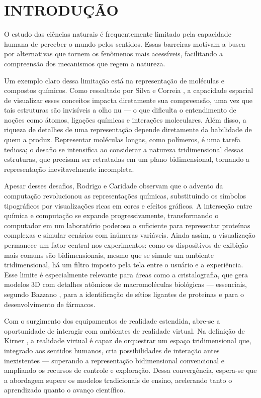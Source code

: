 \chapter{\MakeUppercase{Introdução}}\label{chap:introducao}

O estudo das ciências naturais é frequentemente limitado pela capacidade humana de perceber o mundo pelos sentidos. Essas barreiras motivam a busca por alternativas que tornem os fenômenos mais acessíveis, facilitando a compreensão dos mecanismos que regem a natureza.

Um exemplo claro dessa limitação está na representação de moléculas e compostos químicos. Como ressaltado por Silva e Correia \cite{silva_ensino_2024}, a capacidade espacial de visualizar esses conceitos impacta diretamente sua compreensão, uma vez que tais estruturas são invisíveis a olho nu — o que dificulta o entendimento de noções como átomos, ligações químicas e interações moleculares. Além disso, a riqueza de detalhes de uma representação depende diretamente da habilidade de quem a produz. Representar moléculas longas, como polímeros, é uma tarefa tediosa; o desafio se intensifica ao considerar a natureza tridimensional dessas estruturas, que precisam ser retratadas em um plano bidimensional, tornando a representação inevitavelmente incompleta.

Apesar desses desafios, Rodrigo e Caridade \cite{rodrigues_historia_2024} observam que o advento da computação revolucionou as representações químicas, substituindo os símbolos tipográficos por visualizações ricas em cores e efeitos gráficos. A interseção entre química e computação se expande progressivamente, transformando o computador em um laboratório poderoso o suficiente para representar proteínas complexas e simular cenários com inúmeras variáveis. Ainda assim, a visualização permanece um fator central nos experimentos: como os dispositivos de exibição mais comuns são bidimensionais, mesmo que se simule um ambiente tridimensional, há um filtro imposto pela tela entre o usuário e a experiência. Esse limite é especialmente relevante para áreas como a cristalografia, que gera modelos 3D com detalhes atômicos de macromoléculas biológicas — essenciais, segundo Bazzano \cite{bazzano_modelagens_2022}, para a identificação de sítios ligantes de proteínas e para o desenvolvimento de fármacos.

Com o surgimento dos equipamentos de realidade estendida, abre-se a oportunidade de interagir com ambientes de realidade virtual. Na definição de Kirner \cite{kirner_claudio_evolucao_2011}, a realidade virtual é capaz de orquestrar um espaço tridimensional que, integrado aos sentidos humanos, cria possibilidades de interação antes inexistentes — superando a representação bidimensional convencional e ampliando os recursos de controle e exploração. Dessa convergência, espera-se que a abordagem supere os modelos tradicionais de ensino, acelerando tanto o aprendizado quanto o avanço científico.

